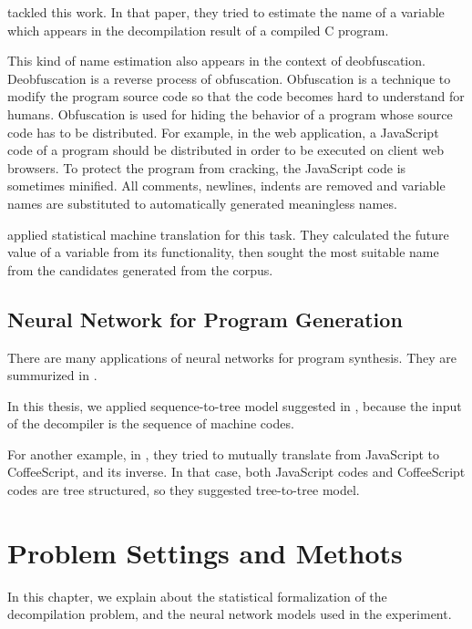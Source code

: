 \documentclass[senior,final,11pt]{iscs-thesis}
\begin{document}
\cite{name_recover_from_decompile_result} tackled this work. 
In that paper, they tried to estimate the name of a variable which appears in the decompilation result of a compiled C program.

This kind of name estimation also appears in the context of deobfuscation.
\cite{deobfsucation_matome}
Deobfuscation is a reverse process of obfuscation.
Obfuscation is a technique to modify the program source code so that the code becomes hard to understand for humans. 
Obfuscation is used for hiding the behavior of a program whose source code has to be distributed.
For example, in the web application, a JavaScript code of a program should be distributed in order to be executed on client web browsers.
To protect the program from cracking, the JavaScript code is sometimes minified. All comments, newlines, indents are removed and variable names are substituted to automatically generated meaningless names. 

\cite{JSNaughty} applied statistical machine translation for this task. 
They calculated the future value of a variable from its functionality, then 
sought the most suitable name from the candidates generated from the corpus.


\section{Neural Network for Program Generation}

There are many applications of neural networks for program synthesis. They are summurized in \cite{deep_programming_matome}.

In this thesis, we applied sequence-to-tree model suggested in \cite{Seq2Tree}, because the input of the decompiler is the sequence of machine codes.

For another example, in \cite{coffeescript_to_javascript}, they tried to mutually translate from JavaScript to CoffeeScript, and its inverse.
In that case, both JavaScript codes and CoffeeScript codes are tree structured, so they suggested tree-to-tree model.


\chapter{Problem Settings and Methots}

In this chapter, we explain about the statistical formalization of the decompilation problem,
and the neural network models used in the experiment.
\end{document}
